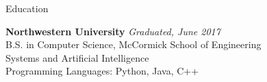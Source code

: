 \documentclass{resume} %
\begin{document}

\begin{rSection}{Education}

{\bf Northwestern University} \hfill {\em Graduated, June 2017} \\ 
B.S. in Computer Science, McCormick School of Engineering \\
Systems and Artificial Intelligence \\
Programming Languages: Python, Java, C++ \\

\end{rSection}

\end{document}
